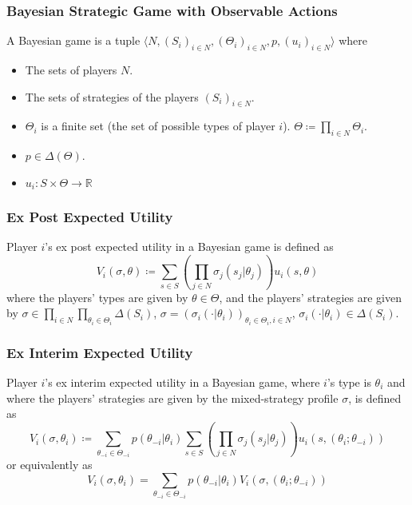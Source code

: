 \documentclass[UTF8,11pt,colorlinks,compress,openany]{beamer}%
\begin{document}
\begin{frame}\frametitle{Bayesian Strategic Game with Observable Actions}
\begin{definition}
	A Bayesian game is a tuple $\langle N,(S_i)_{i\in N},(\Theta_i)_{i\in N},p,(u_i)_{i\in N}\rangle$ where
	\begin{itemize}
		\item The sets of players $N$.
		\item The sets of strategies of the players $(S_i)_{i\in N}$.
		\item $\Theta_i$ is a finite set (the set of possible types of player $i$). $\Theta\coloneqq \prod\limits_{i\in N}\Theta_i$.
		\item $p\in\Delta(\Theta)$.
		\item $u_i: S\times\Theta\to\mathbb R$
	\end{itemize}
\end{definition}
\end{frame}

\begin{frame}\frametitle{Ex Post Expected Utility}
\begin{definition}
	Player $i$'s ex post expected utility in a Bayesian game is defined as
	\[V_i(\sigma,\theta)\coloneqq \sum\limits_{s\in S}\left(\prod\limits_{j\in N}\sigma_j(s_j|\theta_j)\right)u_i(s,\theta)\]
	where the players' types are given by $\theta\in\Theta$, and the players' strategies are given by $\sigma\in\prod\limits_{i\in N}\prod\limits_{\theta_i\in\Theta_i}\Delta(S_i)$, $\sigma=(\sigma_i(\cdot|\theta_i))_{\theta_i\in\Theta_i,i\in N}$, $\sigma_i(\cdot|\theta_i)\in\Delta(S_i)$.
\end{definition}	
\end{frame}

\begin{frame}\frametitle{Ex Interim Expected Utility}
\begin{definition}
	Player $i$'s ex interim expected utility in a Bayesian game, where $i$'s type is $\theta_i$ and where the players' strategies are given by the mixed-strategy profile $\sigma$, is defined as
	\[V_i(\sigma,\theta_i)\coloneqq \sum\limits_{\theta_{-i}\in\Theta_{-i}}p(\theta_{-i}|\theta_i)\sum\limits_{s\in S}\left(\prod\limits_{j\in N}\sigma_j(s_j|\theta_j)\right)u_i(s,(\theta_i;\theta_{-i}))\]
	or equivalently as
	\[V_i(\sigma,\theta_i)=\sum\limits_{\theta_{-i}\in\Theta_{-i}}p(\theta_{-i}|\theta_i)V_i(\sigma,(\theta_i;\theta_{-i}))\]
\end{definition}
\end{frame}
\end{document}
